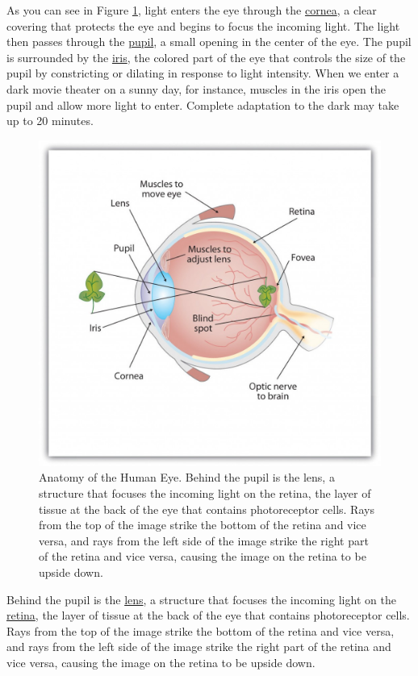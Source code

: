\documentclass[
]{krantz}
\begin{document}
As you can see in Figure \ref{fig:anatomy}, light enters the eye through the \hyperref[cornea]{cornea}, a clear covering that protects the eye and begins to focus the incoming light. The light then passes through the \hyperref[pupil]{pupil}, a small opening in the center of the eye. The pupil is surrounded by the \hyperref[iris]{iris}, the colored part of the eye that controls the size of the pupil by constricting or dilating in response to light intensity. When we enter a dark movie theater on a sunny day, for instance, muscles in the iris open the pupil and allow more light to enter. Complete adaptation to the dark may take up to 20 minutes.

\begin{figure}

{\centering \includegraphics[width=0.6\linewidth]{images/ch2/fig1} 

}

\caption{Anatomy of the Human Eye. Behind the pupil is the lens, a structure that focuses the incoming light on the retina, the layer of tissue at the back of the eye that contains photoreceptor cells. Rays from the top of the image strike the bottom of the retina and vice versa, and rays from the left side of the image strike the right part of the retina and vice versa, causing the image on the retina to be upside down.}\label{fig:anatomy}
\end{figure}

Behind the pupil is the \hyperref[lens]{lens}, a structure that focuses the incoming light on the \hyperref[retina]{retina}, the layer of tissue at the back of the eye that contains photoreceptor cells. Rays from the top of the image strike the bottom of the retina and vice versa, and rays from the left side of the image strike the right part of the retina and vice versa, causing the image on the retina to be upside down.
\end{document}
